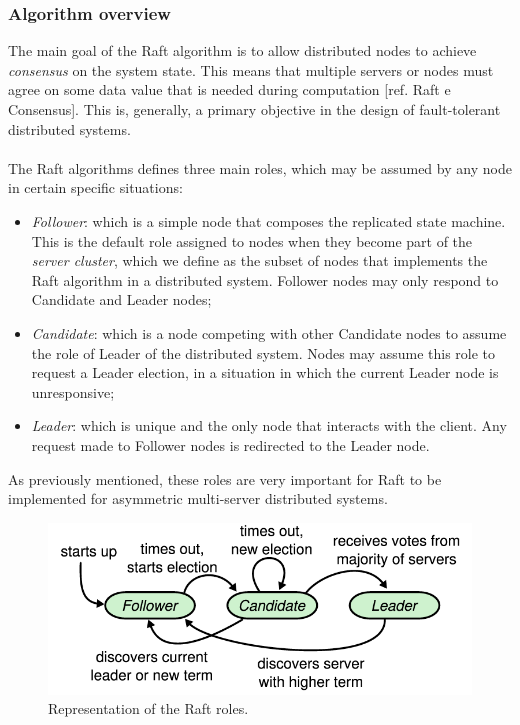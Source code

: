 \subsubsection{Algorithm overview}
The main goal of the Raft algorithm is to allow distributed nodes to achieve \textit{consensus} on the system state. This means that multiple servers or nodes must agree on some data value that is needed during computation [ref. Raft e Consensus]. This is, generally, a primary objective in the design of fault-tolerant distributed systems. \\ \\
The Raft algorithms defines three main roles, which may be assumed by any node in certain specific situations:
\begin{itemize}
	\item \textit{Follower}: which is a simple node that composes the replicated state machine. This is the default role assigned to nodes when they become part of the \textit{server cluster}, which we define as the subset of nodes that implements the Raft algorithm in a distributed system. Follower nodes may only respond to Candidate and Leader nodes;
	\item \textit{Candidate}: which is a node competing with other Candidate nodes to assume the role of Leader of the distributed system. Nodes may assume this role to request a Leader election, in a situation in which the current Leader node is unresponsive;
	\item \textit{Leader}: which is unique and the only node that interacts with the client. Any request made to Follower nodes is redirected to the Leader node.
\end{itemize}
As previously mentioned, these roles are very important for Raft to be implemented for asymmetric multi-server distributed systems.
\begin{figure}[h]
	\centering
	\includegraphics[width=0.7\linewidth]{"immagini/Technologies/image3.png"}
	\caption{Representation of the Raft roles.}
	\label{fig:roles}
\end{figure}
